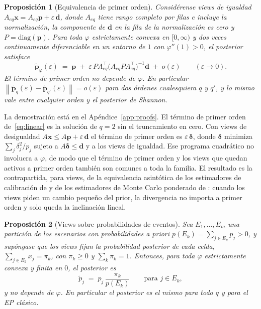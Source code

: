 \documentclass[11pt]{article}
\newtheorem{proposition}{Proposici\'on}
\newcommand{\p}{\mathbf{p}}
\newcommand{\pt}{\tilde{\mathbf{p}}}
\newcommand{\x}{\mathbf{x}}
\newcommand{\norm}[1]{\left\lVert #1 \right\rVert}
\begin{document}
\begin{proposition}[Equivalencia de primer orden]\label{prop:local}
Consid\'erense views de igualdad
$A_{eq}\x = A_{eq}\p + \varepsilon\,\mathbf{d}$, donde $A_{eq}$ tiene rango
completo por filas e incluye la normalizaci\'on, la componente de
$\mathbf{d}$ en la fila de la normalizaci\'on es cero y
$P = \mathrm{diag}(\p)$. Para toda $\varphi$ estrictamente convexa en
$[0,\infty)$ y dos veces continuamente diferenciable en un entorno de $1$
con $\varphi''(1) > 0$, el posterior satisface
\begin{equation}\label{eq:linear}
\pt_\varphi(\varepsilon) \;=\; \p \;+\; \varepsilon\, P A_{eq}^\top
\big(A_{eq} P A_{eq}^\top\big)^{-1} \mathbf{d} \;+\; o(\varepsilon)
\qquad (\varepsilon \to 0).
\end{equation}
El t\'ermino de primer orden no depende de $\varphi$. En particular
$\norm{\pt_q(\varepsilon) - \pt_{q'}(\varepsilon)} = o(\varepsilon)$ para dos
\'ordenes cualesquiera $q$ y $q'$, y lo mismo vale entre cualquier orden y el
posterior de Shannon.
\end{proposition}

La demostraci\'on est\'a en el Ap\'endice~\ref{app:proofs}. El t\'ermino de
primer orden de~\eqref{eq:linear} es la soluci\'on de $q=2$ sin el
truncamiento en cero. Con views de desigualdad
$A\x \le A\p + \varepsilon\,\mathbf{d}$ el t\'ermino de primer orden es
$\varepsilon\,\boldsymbol{\delta}$, donde $\boldsymbol{\delta}$ minimiza
$\sum_j \delta_j^2/p_j$ sujeto a $A\boldsymbol{\delta} \le \mathbf{d}$ y a
los views de igualdad. Ese programa cuadr\'atico no involucra a $\varphi$,
de modo que el t\'ermino de primer orden y los views que quedan activos a
primer orden tambi\'en son comunes a toda la familia. El resultado es la contrapartida, para views, de
la equivalencia asint\'otica de los estimadores de calibraci\'on de
\citet{DevilleSarndal1992} y de los estimadores de Monte Carlo ponderado de
\citet{GlassermanYu2005}: cuando los views piden un cambio peque\~no del
prior, la divergencia no importa a primer orden y solo queda la inclinaci\'on
lineal.

\begin{proposition}[Views sobre probabilidades de eventos]\label{prop:jeffrey}
Sea $E_1,\dots,E_m$ una partici\'on de los escenarios con probabilidades a
priori $p(E_k) = \sum_{j \in E_k} p_j > 0$, y sup\'ongase que los views fijan
la probabilidad posterior de cada celda,
$\sum_{j \in E_k} x_j = \pi_k$, con $\pi_k \ge 0$ y $\sum_k \pi_k = 1$.
Entonces, para toda $\varphi$ estrictamente convexa y finita en $0$, el
posterior es
\begin{equation}\label{eq:jeffrey}
\tilde p_j \;=\; p_j\, \frac{\pi_k}{p(E_k)} \qquad \text{para } j \in E_k,
\end{equation}
y no depende de $\varphi$. En particular el posterior es el mismo para todo
$q$ y para el EP cl\'asico.
\end{proposition}
\end{document}
